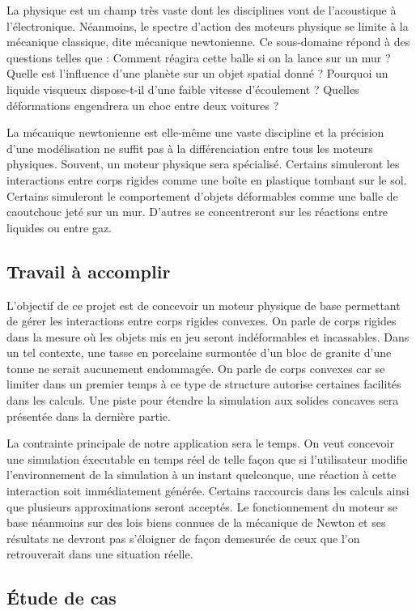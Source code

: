 La physique est un champ très vaste dont les disciplines vont de l'acoustique à l'électronique. Néanmoins, le spectre d'action des moteurs physique se limite à la mécanique classique, dite mécanique newtonienne. Ce sous-domaine répond à des questions telles que : Comment réagira cette balle si on la lance sur un mur ? Quelle est l'influence d'une planète sur un objet spatial donné ? Pourquoi un liquide visqueux dispose-t-il d'une faible vitesse d'écoulement ? Quelles déformations engendrera un choc entre deux voitures ?

La mécanique newtonienne est elle-même une vaste discipline et la précision d'une modélisation ne suffit pas à la différenciation entre tous les moteurs physiques. Souvent, un moteur physique sera spécialisé. Certains simuleront les interactions entre corps rigides comme une boîte en plastique tombant sur le sol. Certains simuleront le comportement d'objets déformables comme une balle de caoutchouc jeté sur un mur. D'autres se concentreront sur les réactions entre liquides ou entre gaz.

\subsection{Travail à accomplir}

L'objectif de ce projet est de concevoir un moteur physique de base permettant de gérer les interactions entre corps rigides convexes. On parle de corps rigides dans la mesure o\`u les objets mis en jeu seront indéformables et incassables. Dans un tel contexte, une tasse en porcelaine surmontée d'un bloc de granite d'une tonne ne serait aucunement endommagée. On parle de corps convexes car se limiter dans un premier temps à ce type de structure autorise certaines facilités dans les calculs. Une piste pour étendre la simulation aux solides concaves sera présentée dans la dernière partie.

La contrainte principale de notre application sera le temps. On veut concevoir une simulation éxecutable en temps réel de telle façon que si l'utilisateur modifie l'environnement de la simulation à un instant quelconque, une réaction à cette interaction soit immédiatement générée. Certains raccourcis dans les calculs ainsi que plusieurs approximations seront acceptés. Le fonctionnement du moteur se base néanmoins sur des lois biens connues de la mécanique de Newton et ses résultats ne devront pas s'éloigner de façon demesurée de ceux que l'on retrouverait dans une situation réelle.

\subsection{\'Etude de cas}

